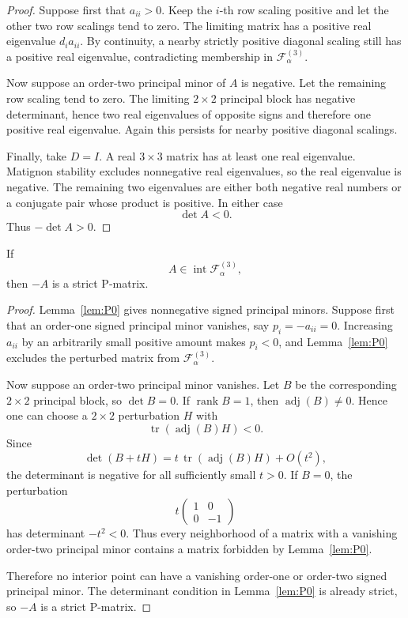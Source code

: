 \begin{proof}
Suppose first that \(a_{ii}>0\). Keep the \(i\)-th row scaling positive and let the other two row scalings tend to zero. The limiting matrix has a positive real eigenvalue \(d_i a_{ii}\). By continuity, a nearby strictly positive diagonal scaling still has a positive real eigenvalue, contradicting membership in \(\mathcal F_\alpha^{(3)}\).

Now suppose an order-two principal minor of \(A\) is negative. Let the remaining row scaling tend to zero. The limiting \(2\times2\) principal block has negative determinant, hence two real eigenvalues of opposite signs and therefore one positive real eigenvalue. Again this persists for nearby positive diagonal scalings.

Finally, take \(D=I\). A real \(3\times3\) matrix has at least one real eigenvalue. Matignon stability excludes nonnegative real eigenvalues, so the real eigenvalue is negative. The remaining two eigenvalues are either both negative real numbers or a conjugate pair whose product is positive. In either case
\[
\det A<0.
\]
Thus \(-\det A>0\).
\end{proof}

\begin{corollary}
\label{cor:strictP-interior}
If
\[
A\in\operatorname{int}\mathcal F_\alpha^{(3)},
\]
then \(-A\) is a strict P-matrix.
\end{corollary}

\begin{proof}
Lemma~\ref{lem:P0} gives nonnegative signed principal minors. Suppose first that an order-one signed principal minor vanishes, say \(p_i=-a_{ii}=0\). Increasing \(a_{ii}\) by an arbitrarily small positive amount makes \(p_i<0\), and Lemma~\ref{lem:P0} excludes the perturbed matrix from \(\mathcal F_\alpha^{(3)}\).

Now suppose an order-two principal minor vanishes. Let \(B\) be the corresponding \(2\times2\) principal block, so \(\det B=0\). If \(\operatorname{rank}B=1\), then \(\operatorname{adj}(B)\neq0\). Hence one can choose a \(2\times2\) perturbation \(H\) with
\[
\operatorname{tr}(\operatorname{adj}(B)H)<0.
\]
Since
\[
\det(B+tH)
=
t\,\operatorname{tr}(\operatorname{adj}(B)H)+O(t^2),
\]
the determinant is negative for all sufficiently small \(t>0\). If \(B=0\), the perturbation
\[
t\begin{pmatrix}1&0\\0&-1\end{pmatrix}
\]
has determinant \(-t^2<0\). Thus every neighborhood of a matrix with a vanishing order-two principal minor contains a matrix forbidden by Lemma~\ref{lem:P0}.

Therefore no interior point can have a vanishing order-one or order-two signed principal minor. The determinant condition in Lemma~\ref{lem:P0} is already strict, so \(-A\) is a strict P-matrix.
\end{proof}

